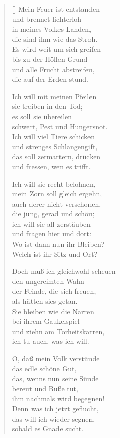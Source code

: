\begin{multicols}{2}
\begin{verse}[\versewidth]
 Mein Feuer ist entstanden\\
und brennet lichterloh\\
in meines Volkes Landen,\\
die sind ihm wie das Stroh.\\
Es wird weit um sich greifen\\
bis zu der Höllen Grund\\
und alle Frucht abstreifen,\\
die auf der Erden stund.

 Ich will mit meinen Pfeilen\\
sie treiben in den Tod;\\
es soll sie übereilen\\
schwert, Pest und Hungersnot.\\
Ich will viel Tiere schicken\\
und strenges Schlangengift,\\
das soll zermartern, drücken\\
und fressen, wen es trifft.

 Ich will sie recht belohnen,\\
mein Zorn soll gleich ergehn,\\
auch derer nicht verschonen,\\
die jung, gerad und schön;\\
ich will sie all zerstäuben\\
und fragen hier und dort:\\
Wo ist dann nun ihr Bleiben?\\
Welch ist ihr Sitz und Ort?

 Doch muß ich gleichwohl scheuen\\
den ungereimten Wahn\\
der Feinde, die sich freuen,\\
als hätten sies getan.\\
Sie bleiben wie die Narren\\
bei ihrem Gaukelspiel\\
und ziehn am Torheitskarren,\\
ich tu auch, was ich will.

 O, daß mein Volk verstünde\\
das edle schöne Gut,\\
das, wenns nun seine Sünde\\
bereut und Buße tut,\\
ihm nachmals wird begegnen!\\
Denn was ich jetzt geflucht,\\
das will ich wieder segnen,\\
sobald es Gnade sucht.


\end{verse}
\end{multicols}
